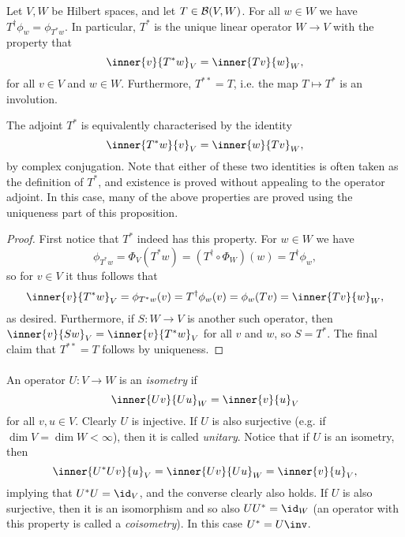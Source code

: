\documentclass[a4paper, 11pt]{memoir}
\numberwithin{equation}{chapter}
\newcommand{\newpar}{\paragraph{}}
\begin{document}
\begin{proposition}
    \label{prop:adjoint-inner-product}
    Let $V,W$ be Hilbert spaces, and let $T \in \mathcal{B}(V,W)$. For all $w \in W$ we have $T^\dagger \phi_w = \phi_{T^* w}$. In particular, $T^*$ is the unique linear operator $W \to V$ with the property that
    \begin{equation*}
        \inner{v}{T^*w}_V = \inner{Tv}{w}_W,
    \end{equation*}
    for all $v \in V$ and $w \in W$. Furthermore, $T^{**} = T$, i.e. the map $T \mapsto T^*$ is an involution.
\end{proposition}
%
The adjoint $T^*$ is equivalently characterised by the identity
%
\begin{equation*}
    \inner{T^*w}{v}_V = \inner{w}{Tv}_W,
\end{equation*}
%
by complex conjugation. Note that either of these two identities is often taken as the definition of $T^*$, and existence is proved without appealing to the operator adjoint. In this case, many of the above properties are proved using the uniqueness part of this proposition.

\begin{proof}
    First notice that $T^*$ indeed has this property. For $w \in W$ we have
    \begin{equation*}
        \phi_{T^* w}
            = \Phi_V (T^* w)
            = (T^\dagger \circ \Phi_W)(w)
            = T^\dagger \phi_w,
    \end{equation*}
    so for $v \in V$ it thus follows that
    \begin{equation*}
        \inner{v}{T^* w}_V
            = \phi_{T^* w}(v)
            = T^\dagger \phi_w (v)
            = \phi_w(Tv)
            = \inner{Tv}{w}_W,
    \end{equation*}
    as desired. Furthermore, if $S \colon W \to V$ is another such operator, then $\inner{v}{Sw}_V = \inner{v}{T^*w}_V$ for all $v$ and $w$, so $S = T^*$. The final claim that $T^{**} = T$ follows by uniqueness.
\end{proof}


\newpar

An operator $U \colon V \to W$ is an \emph{isometry} if
%
\begin{equation*}
    \inner{Uv}{Uu}_W
        = \inner{v}{u}_V
\end{equation*}
%
for all $v,u \in V$. Clearly $U$ is injective. If $U$ is also surjective (e.g. if $\dim V = \dim W < \infty$), then it is called \emph{unitary}. Notice that if $U$ is an isometry, then
%
\begin{equation*}
    \inner{U^*Uv}{u}_V
        = \inner{Uv}{Uu}_W
        = \inner{v}{u}_V,
\end{equation*}
%
implying that $U^*U = \id_V$, and the converse clearly also holds. If $U$ is also surjective, then it is an isomorphism and so also $UU^* = \id_W$ (an operator with this property is called a \emph{coisometry}). In this case $U^* = U\inv$.
\end{document}

